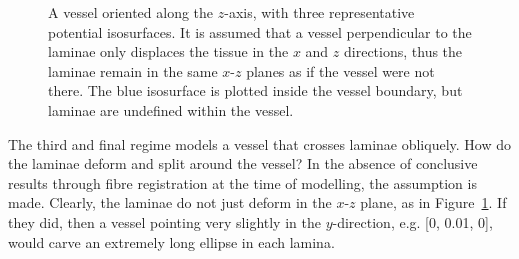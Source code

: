   \begin{figure}[htbp]
    \centering
    \caption{A vessel oriented along the $z$-axis, with three representative potential isosurfaces. It is assumed that a vessel perpendicular to the laminae only displaces the tissue in the $x$ and $z$ directions, thus the laminae remain in the same $x$-$z$ planes as if the vessel were not there. The blue isosurface is plotted inside the vessel boundary, but laminae are undefined within the vessel.}
    \label{fig:perpendicular}
  \end{figure}

  The third and final regime models a vessel that crosses laminae obliquely. How do the laminae deform and split around the vessel? In the absence of conclusive results through fibre registration at the time of modelling, the assumption is made. Clearly, the laminae do not just deform in the $x$-$z$ plane, as in Figure~\ref{fig:perpendicular}. If they did, then a vessel pointing very slightly in the $y$-direction, e.g. [0, 0.01, 0], would carve an extremely long ellipse in each lamina.
  
